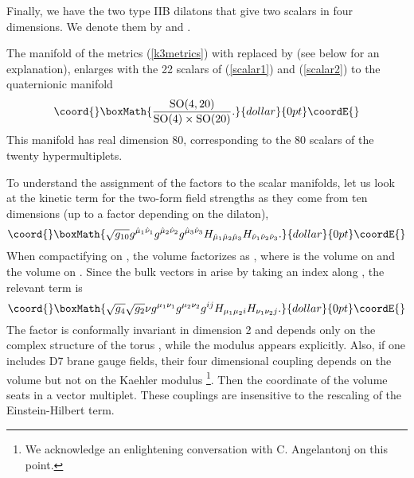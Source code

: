 \documentclass[a4paper,12pt]{article}
\begin{document}
Finally, we have the two type IIB dilatons that  give two scalars
in four dimensions. We denote them by \coordHE{} and \coordHE{}.

\bigskip

The manifold of the \myHighlight{$\K$}\coordHE{} metrics (\ref{k3metrics}) with \myHighlight{$\R_\K^+$}\coordHE{}
replaced by  \coordHE{} (see below for an explanation), enlarges
with the 22 scalars of (\ref{scalar1}) and (\ref{scalar2}) to the
quaternionic manifold \cite{se}
$$\coord{}\boxMath{\frac{\rSO(4,20)}{\rSO(4)\times \rSO(20)}.}{dollar}{0pt}\coordE{}$$
This manifold has real dimension 80, corresponding to the 80
scalars of the twenty hypermultiplets.

To understand the assignment of the \myHighlight{$\R^+$}\coordHE{} factors to the scalar
manifolds, let us look at the kinetic term for the two-form field
strengths as they come from ten dimensions (up to a factor
depending on the dilaton),
$$\coord{}\boxMath{\sqrt{g_{10}}g^{\hat\mu_1\hat\nu_1}g^{\hat\mu_2\hat\nu_2}g^{\hat\mu_3\hat\nu_3}H_{\hat\mu_1\hat\mu_2\hat\mu_3}
H_{\hat\nu_1\hat\nu_2\hat\nu_3}.}{dollar}{0pt}\coordE{}$$ When compactifying on \coordHE{}, the volume factorizes as
\coordHE{}, where \myHighlight{$\nu$}\coordHE{} is the
volume on \myHighlight{$\K$}\coordHE{} and \coordHE{} the volume on \coordHE{}. Since the
bulk vectors in \coordHE{} arise by taking an index along \coordHE{}, the
relevant term is
$$\coord{}\boxMath{\sqrt{g_{4}}\sqrt{g_{2}}\nu g^{\mu_1\nu_1}g^{\mu_2\nu_2}g^{ij}H_{\mu_1\mu_2i}
H_{\nu_1\nu_2j}.}{dollar}{0pt}\coordE{}$$ The factor \coordHE{} is conformally
invariant in dimension 2 and depends only on the complex structure
of the torus \myHighlight{$\tau$}\coordHE{}, while the modulus \coordHE{} appears
explicitly.  Also, if one includes D7 brane gauge fields, their
four dimensional coupling depends on the \myHighlight{$\K$}\coordHE{} volume but not on
the \coordHE{} Kaehler modulus \footnote{We acknowledge an
enlightening conversation with C. Angelantonj on this point.}.
Then the coordinate \coordHE{} of the \myHighlight{$\K$}\coordHE{} volume seats in a vector
multiplet.  These couplings are insensitive to the rescaling of
the Einstein-Hilbert term.
\end{document}
